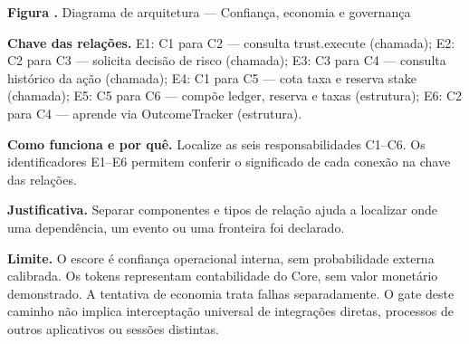 {\small\textbf{Figura \thefigure.} Diagrama de arquitetura --- Confiança, economia e governança}\par\smallskip
{\footnotesize\textbf{Chave das relações.} E1: C1 para C2 --- consulta trust.execute (chamada); E2: C2 para C3 --- solicita decisão de risco (chamada); E3: C3 para C4 --- consulta histórico da ação (chamada); E4: C1 para C5 --- cota taxa e reserva stake (chamada); E5: C5 para C6 --- compõe ledger, reserva e taxas (estrutura); E6: C2 para C4 --- aprende via OutcomeTracker (estrutura).}\par\smallskip
\noindent\textbf{Como funciona e por quê.} Localize as seis responsabilidades C1--C6. Os identificadores E1--E6 permitem conferir o significado de cada conexão na chave das relações.\par
\noindent\textbf{Justificativa.} Separar componentes e tipos de relação ajuda a localizar onde uma dependência, um evento ou uma fronteira foi declarado.\par
\noindent\textbf{Limite.} O escore é confiança operacional interna, sem probabilidade externa calibrada. Os tokens representam contabilidade do Core, sem valor monetário demonstrado. A tentativa de economia trata falhas separadamente. O gate deste caminho não implica interceptação universal de integrações diretas, processos de outros aplicativos ou sessões distintas.\par\smallskip
{}
